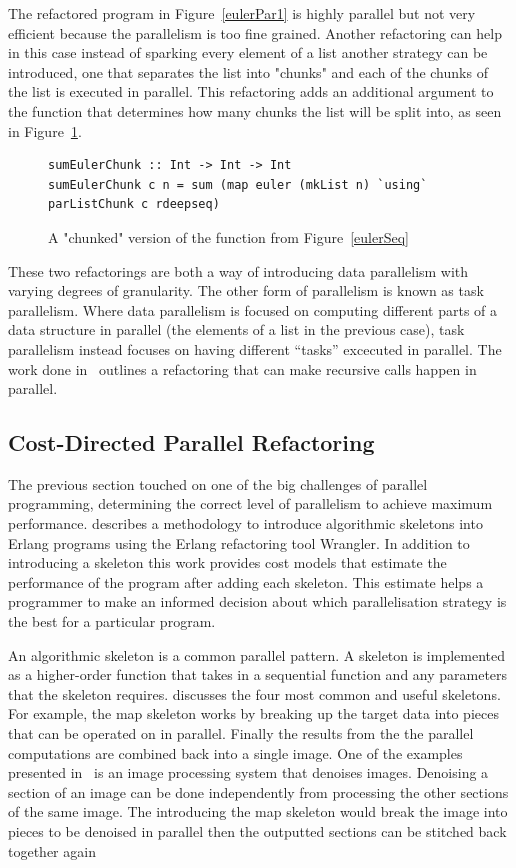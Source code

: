 The refactored program in Figure~\ref{eulerPar1} is highly parallel but not very efficient because the parallelism is too fine grained. Another refactoring can help in this case instead of sparking every element of a list another strategy can be introduced, one that separates the list into "chunks" and each of the chunks of the list is executed in parallel. This refactoring adds an additional argument to the function that determines how many chunks the list will be split into, as seen in Figure~\ref{eulerChunk}.
  
\begin{figure}[t]
\begin{lstlisting}
sumEulerChunk :: Int -> Int -> Int
sumEulerChunk c n = sum (map euler (mkList n) `using` parListChunk c rdeepseq)
\end{lstlisting}
\caption{A "chunked" version of the function from Figure~\ref{eulerSeq}}
\label{eulerChunk}
\end{figure}  

These two refactorings are both a way of introducing data parallelism with varying degrees of granularity. The other form of parallelism is known as task parallelism. Where data parallelism is focused on computing different parts of a data structure in parallel (the elements of a list in the previous case), task parallelism instead focuses on having different ``tasks'' excecuted in parallel. The work done in~\cite{paraforming} outlines a refactoring that can make recursive calls happen in parallel.

\subsection{Cost-Directed Parallel Refactoring}

The previous section touched on one of the big challenges of parallel programming, determining the correct level of parallelism to achieve maximum performance. \cite{parallelErl} describes a methodology to introduce algorithmic skeletons into Erlang programs using the Erlang refactoring tool Wrangler. In addition to introducing a skeleton this work provides cost models that estimate the performance of the program after adding each skeleton. This estimate helps a programmer to make an informed decision about which parallelisation strategy is the best for a particular program. 

An algorithmic skeleton is a common parallel pattern. A skeleton is implemented as a higher-order function that takes in a sequential function and any parameters that the skeleton requires. \cite{parallelErl} discusses the four most common and useful skeletons. For example, the map skeleton works by breaking up the target data into pieces that can be operated on in parallel. Finally the results from the the parallel computations are combined back into a single image. One of the examples presented in~\cite{parallelErl} is an image processing system that denoises images. Denoising a section of an image can be done independently from processing the other sections of the same image. The introducing the map skeleton would break the image into pieces to be denoised in parallel then the outputted sections can be stitched back together again

